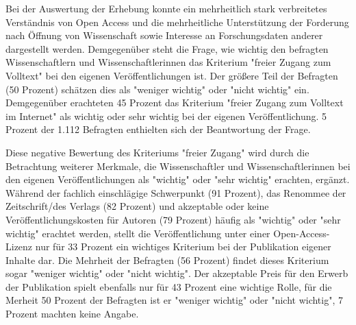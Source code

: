 Bei der Auswertung der Erhebung konnte ein mehrheitlich stark verbreitetes Verständnis von Open Access und die mehrheitliche Unterstützung der Forderung nach Öffnung von Wissenschaft sowie Interesse an Forschungsdaten anderer dargestellt werden. Demgegenüber steht die Frage, wie wichtig den befragten Wissenschaftlern und Wissenschaftlerinnen das Kriterium "freier Zugang zum Volltext" bei den eigenen Veröffentlichungen ist. Der größere Teil der Befragten (50 Prozent) schätzen dies als "weniger wichtig" oder "nicht wichtig" ein. Demgegenüber erachteten 45 Prozent das Kriterium "freier Zugang zum Volltext im Internet" als wichtig oder sehr wichtig bei der eigenen Veröffentlichung. 5 Prozent der 1.112 Befragten enthielten sich der Beantwortung der Frage.

Diese negative Bewertung des Kriteriums "freier Zugang" wird durch die Betrachtung weiterer Merkmale, die Wissenschaftler und Wissenschaftlerinnen bei den eigenen Veröffentlichungen als "wichtig" oder "sehr wichtig" erachten, ergänzt. Während der fachlich einschlägige Schwerpunkt (91 Prozent), das Renommee der Zeitschrift/des Verlags (82 Prozent) und akzeptable oder keine Veröffentlichungskosten für Autoren (79 Prozent) häufig als "wichtig" oder "sehr wichtig" erachtet werden, stellt die Veröffentlichung unter einer Open-Access-Lizenz nur für 33 Prozent ein wichtiges Kriterium bei der Publikation eigener Inhalte dar. Die Mehrheit der Befragten (56 Prozent) findet dieses Kriterium sogar "weniger wichtig" oder "nicht wichtig". Der akzeptable Preis für den Erwerb der Publikation spielt ebenfalls nur für 43 Prozent eine wichtige Rolle, für die Merheit 50 Prozent der Befragten ist er "weniger wichtig" oder "nicht wichtig", 7 Prozent machten keine Angabe.
 
